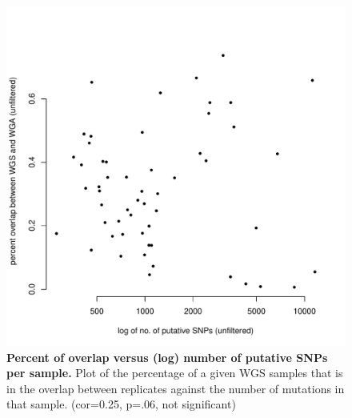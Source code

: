 \documentclass[11pt]{article} %
\begin{document}
\begin{figure}
\centerline{
\includegraphics[width=5in]{unfiltered_total_muts_v_percent_overlap.pdf} }
\caption{\textbf{Percent of overlap versus (log) number of putative SNPs per sample.} Plot of the percentage of a given WGS samples that is in the overlap between replicates against the number of mutations in that sample. (cor=0.25, p=.06, not significant)}
\end{figure}
\end{document}

